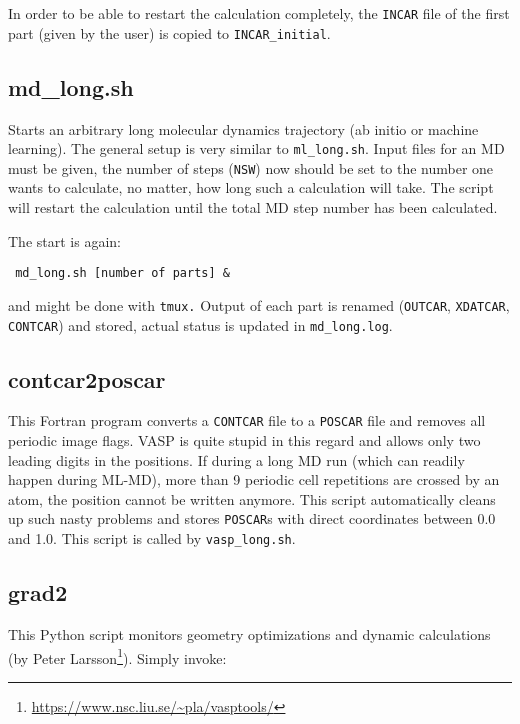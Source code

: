 \documentclass[a4paper,11pt]{article}
\begin{document}
In order to be able to restart the calculation completely, the \texttt{INCAR} file of the first 
part (given by the user) is copied to \texttt{INCAR\_initial}.

\subsection{md\_long.sh}\label{md_long}

Starts an arbitrary long molecular dynamics trajectory (ab initio or machine learning).
The general setup is very similar to \texttt{ml\_long.sh}.
Input files for an MD must be given, the number of steps (\texttt{NSW}) now should be set to the number 
one wants to calculate, no matter, how long such a calculation will take.
The script will restart the calculation until the total MD step number has been calculated. 

The start is again:

\begin{verbatim}
 md_long.sh [number of parts] &
\end{verbatim}

and might be done with \texttt{tmux.}
Output of each part is renamed (\texttt{OUTCAR}, \texttt{XDATCAR}, \texttt{CONTCAR}) and stored, 
actual status is updated in \texttt{md\_long.log}.

\subsection{contcar2poscar}\label{contcar2poscar}
 
This Fortran program converts a \texttt{CONTCAR} file to a \texttt{POSCAR} file 
and removes all periodic image flags. 
VASP is quite stupid in this regard and allows only two leading digits in the 
positions. If during a long MD run (which can readily happen during ML-MD), more than 9 periodic cell repetitions 
are crossed by an atom, the position cannot be written anymore.
This script automatically cleans up such nasty problems and stores \texttt{POSCAR}s with 
direct coordinates between 0.0 and 1.0.
This script is called by \texttt{vasp\_long.sh}.

\subsection{grad2}\label{grad2}

This Python script monitors geometry optimizations and dynamic calculations (by Peter 
Larsson\footnote{\url{https://www.nsc.liu.se/~pla/vasptools/}}).
Simply invoke:
\end{document}
